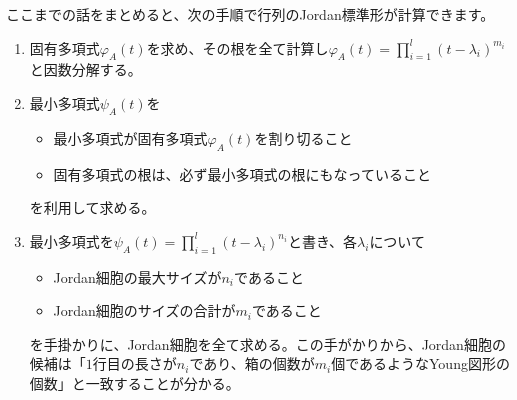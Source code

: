 ここまでの話をまとめると、次の手順で行列のJordan標準形が計算できます。
\begin{enumerate}
\item 固有多項式$\varphi_A(t)$を求め、その根を全て計算し$\varphi_A(t) = \prod_{i = 1}^l (t - \lambda_i)^{m_i}$と因数分解する。
\item 最小多項式$\psi_A(t)$を
\begin{itemize}
\item 最小多項式が固有多項式$\varphi_A(t)$を割り切ること
\item 固有多項式の根は、必ず最小多項式の根にもなっていること
\end{itemize}
を利用して求める。
\item 最小多項式を$\psi_A(t) = \prod_{i = 1}^l (t - \lambda_i)^{n_i}$と書き、各$\lambda_i$について
\begin{itemize}
\item Jordan細胞の最大サイズが$n_i$であること
\item Jordan細胞のサイズの合計が$m_i$であること
\end{itemize}
を手掛かりに、Jordan細胞を全て求める。この手がかりから、Jordan細胞の候補は「$1$行目の長さが$n_i$であり、箱の個数が$m_i$個であるようなYoung図形の個数」と一致することが分かる。
\end{enumerate}

